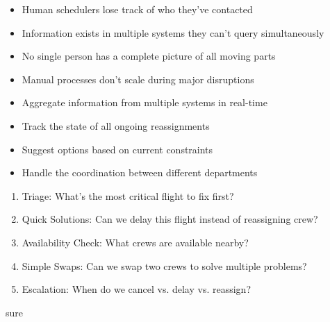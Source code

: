 \begin{botresponse}
\begin{itemize}
\item Human schedulers lose track of who they've contacted
\item Information exists in multiple systems they can't query simultaneously
\item No single person has a complete picture of all moving parts
\item Manual processes don't scale during major disruptions
\end{itemize}

\begin{itemize}
\item Aggregate information from multiple systems in real-time
\item Track the state of all ongoing reassignments
\item Suggest options based on current constraints
\item Handle the coordination between different departments
\end{itemize}

\begin{enumerate}
\item Triage: What's the most critical flight to fix first?
\item Quick Solutions: Can we delay this flight instead of reassigning crew?
\item Availability Check: What crews are available nearby?
\item Simple Swaps: Can we swap two crews to solve multiple problems?
\item Escalation: When do we cancel vs. delay vs. reassign?
\end{enumerate}
\end{botresponse}

\begin{userprompt}
sure
\end{userprompt}

\begin{botresponse}
\end{botresponse}
